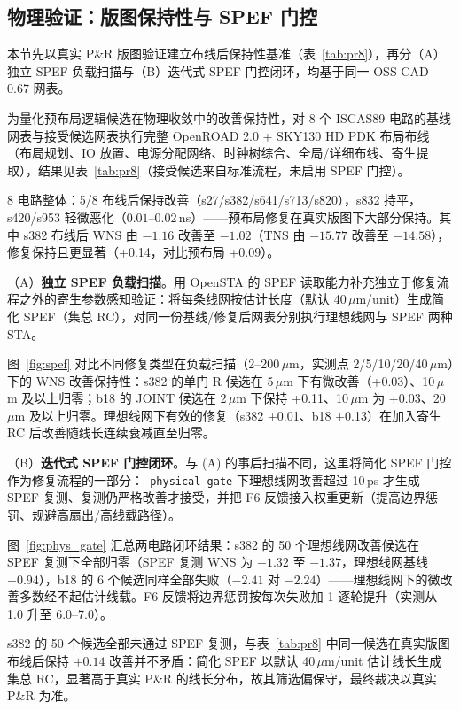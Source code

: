 \documentclass[journal]{IEEEtran}
\begin{document}
\subsection{物理验证：版图保持性与 SPEF 门控}\label{sec:phys_closure}

本节先以真实 P\&R 版图验证建立布线后保持性基准（表~\ref{tab:pr8}），再分（A）独立 SPEF 负载扫描与（B）迭代式 SPEF 门控闭环，均基于同一 OSS-CAD 0.67 网表。

为量化预布局逻辑候选在物理收敛中的改善保持性，对 8 个 ISCAS89 电路的基线网表与接受候选网表执行完整 OpenROAD 2.0 + SKY130 HD PDK 布局布线（布局规划、IO 放置、电源分配网络、时钟树综合、全局/详细布线、寄生提取），结果见表~\ref{tab:pr8}（接受候选来自标准流程，未启用 SPEF 门控）。

8 电路整体：5/8 布线后保持改善（s27/s382/s641/s713/s820），s832 持平，s420/s953 轻微恶化（$0.01$--$0.02\,$ns）——预布局修复在真实版图下大部分保持。其中 s382 布线后 WNS 由 $-1.16$ 改善至 $-1.02$（TNS 由 $-15.77$ 改善至 $-14.58$），修复保持且更显著（+0.14，对比预布局 +0.09）。

（A）\textbf{独立 SPEF 负载扫描}。用 OpenSTA 的 SPEF 读取能力补充独立于修复流程之外的寄生参数感知验证：将每条线网按估计长度（默认 40\,$\mu$m/unit）生成简化 SPEF（集总 RC），对同一份基线/修复后网表分别执行理想线网与 SPEF 两种 STA。

图~\ref{fig:spef} 对比不同修复类型在负载扫描（2--200\,$\mu$m，实测点 2/5/10/20/40\,$\mu$m）下的 WNS 改善保持性：s382 的单门 R 候选在 5\,$\mu$m 下有微改善（+0.03）、10\,$\mu$m 及以上归零；b18 的 JOINT 候选在 2\,$\mu$m 下保持 +0.11、10\,$\mu$m 为 +0.03、20\,$\mu$m 及以上归零。理想线网下有效的修复（s382 +0.01、b18 +0.13）在加入寄生 RC 后改善随线长连续衰减直至归零。

（B）\textbf{迭代式 SPEF 门控闭环}。与 (A) 的事后扫描不同，这里将简化 SPEF 门控作为修复流程的一部分：\texttt{--physical-gate} 下理想线网改善超过 10\,ps 才生成 SPEF 复测、复测仍严格改善才接受，并把 F6 反馈接入权重更新（提高边界惩罚、规避高扇出/高线载路径）。

图~\ref{fig:phys_gate} 汇总两电路闭环结果：s382 的 50 个理想线网改善候选在 SPEF 复测下全部归零（SPEF 复测 WNS 为 $-1.32$ 至 $-1.37$，理想线网基线 $-0.94$），b18 的 6 个候选同样全部失败（$-2.41$ 对 $-2.24$）——理想线网下的微改善多数经不起估计线载。F6 反馈将边界惩罚按每次失败加 1 逐轮提升（实测从 1.0 升至 6.0--7.0）。

s382 的 50 个候选全部未通过 SPEF 复测，与表~\ref{tab:pr8} 中同一候选在真实版图布线后保持 $+0.14$ 改善并不矛盾：简化 SPEF 以默认 40\,$\mu$m/unit 估计线长生成集总 RC，显著高于真实 P\&R 的线长分布，故其筛选偏保守，最终裁决以真实 P\&R 为准。
\end{document}
